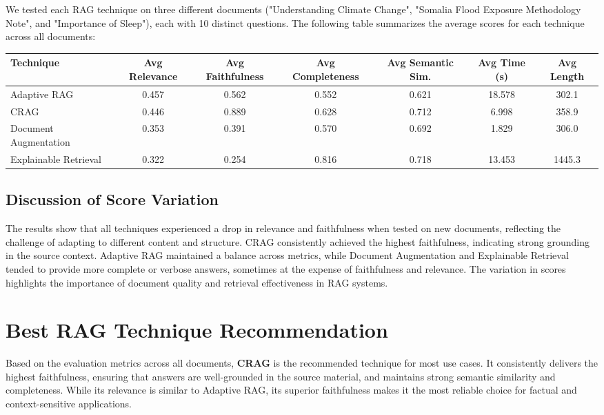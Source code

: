 We tested each RAG technique on three different documents ("Understanding Climate Change", "Somalia Flood Exposure Methodology Note", and "Importance of Sleep"), each with 10 distinct questions. The following table summarizes the average scores for each technique across all documents:

\begin{center}
\begin{tabular}{|l|c|c|c|c|c|c|}
\hline
\textbf{Technique} & \textbf{Avg Relevance} & \textbf{Avg Faithfulness} & \textbf{Avg Completeness} & \textbf{Avg Semantic Sim.} & \textbf{Avg Time (s)} & \textbf{Avg Length} \\
\hline
Adaptive RAG & 0.457 & 0.562 & 0.552 & 0.621 & 18.578 & 302.1 \\
CRAG & 0.446 & 0.889 & 0.628 & 0.712 & 6.998 & 358.9 \\
Document Augmentation & 0.353 & 0.391 & 0.570 & 0.692 & 1.829 & 306.0 \\
Explainable Retrieval & 0.322 & 0.254 & 0.816 & 0.718 & 13.453 & 1445.3 \\
\hline
\end{tabular}
\end{center}

\subsection{Discussion of Score Variation}

The results show that all techniques experienced a drop in relevance and faithfulness when tested on new documents, reflecting the challenge of adapting to different content and structure. CRAG consistently achieved the highest faithfulness, indicating strong grounding in the source context. Adaptive RAG maintained a balance across metrics, while Document Augmentation and Explainable Retrieval tended to provide more complete or verbose answers, sometimes at the expense of faithfulness and relevance. The variation in scores highlights the importance of document quality and retrieval effectiveness in RAG systems.

\section{Best RAG Technique Recommendation}

Based on the evaluation metrics across all documents, \textbf{CRAG} is the recommended technique for most use cases. It consistently delivers the highest faithfulness, ensuring that answers are well-grounded in the source material, and maintains strong semantic similarity and completeness. While its relevance is similar to Adaptive RAG, its superior faithfulness makes it the most reliable choice for factual and context-sensitive applications.

